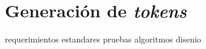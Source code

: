 %
%

\section{Generación de \textit{tokens}}

{requerimientos}
{estandares}
{pruebas}
{algoritmos}
{disenio}
